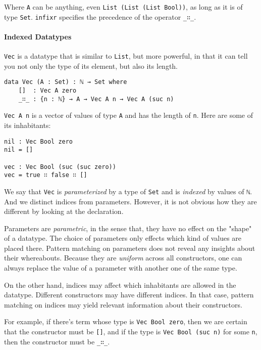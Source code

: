\documentclass[12pt, a4paper]{article}
\begin{document}
Where {\lstinline|A|} can be anything, even {\lstinline|List (List (List Bool))|},
as long as it is of type {\lstinline|Set|}. {\lstinline|infixr|} specifies the
precedence of the operator {\lstinline|_∷_|}.

\paragraph{Indexed Datatypes}


{\lstinline|Vec|} is a datatype that is similar to {\lstinline|List|}, but more
powerful, in that it can tell you not only the type of its element, but also its
length.

\begin{lstlisting}
data Vec (A : Set) : ℕ → Set where
    []  : Vec A zero
    _∷_ : {n : ℕ} → A → Vec A n → Vec A (suc n)
\end{lstlisting}

{\lstinline|Vec A n|} is a vector of values of type {\lstinline|A|} and
has the length of {\lstinline|n|}. Here are some of its inhabitants:

\begin{lstlisting}
nil : Vec Bool zero
nil = []

vec : Vec Bool (suc (suc zero))
vec = true ∷ false ∷ []
\end{lstlisting}

We say that {\lstinline|Vec|} is \textit{parameterized} by a type of {\lstinline|Set|}
and is \textit{indexed} by values of {\lstinline|ℕ|}.
And we distinct indices from parameters. However, it is not obvious how they are
different by looking at the declaration.

Parameters are \textit{parametric}, in the sense that, they have no effect on the "shape" of a datatype.
The choice of parameters only effects which kind of values are placed there.
Pattern matching on parameters does not reveal any insights about their whereabouts.
Because they are \textit{uniform} across all constructors, one can always replace
the value of a parameter with another one of the same type.

On the other hand, indices may affect which inhabitants are allowed in the
datatype. Different constructors may have different indices. In that case, pattern
matching on indices may yield relevant information about their constructors.

For example, if there's term whose type is {\lstinline|Vec Bool zero|}, then
we are certain that the constructor must be {\lstinline|[]|}, and if the type
 is {\lstinline|Vec Bool (suc n)|} for some {\lstinline|n|}, then the constructor
must be {\lstinline|_∷_|}.
\end{document}

